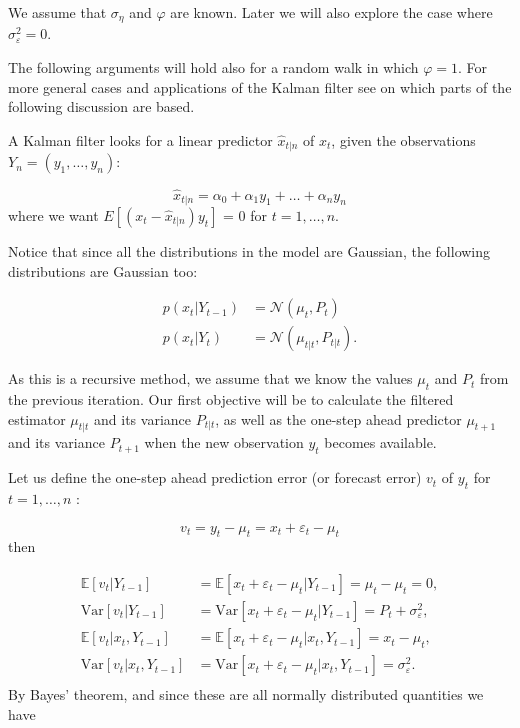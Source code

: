 \documentclass[11pt,a4paper]{article}
\newcommand{\E}{\mathbb{E}}
\newcommand{\var}{\mathrm{Var}}
\begin{document}
We assume that $\sigma_\eta$ and $\varphi$ are known. {\color{blue} Later we will also explore the case where $\sigma^2_\varepsilon=0$}.

The following arguments will hold also for a random walk in which $\varphi = 1$. For more general cases and applications of the Kalman filter see \cite{Durbin} on which parts of the following discussion are based.

A Kalman filter looks for a linear predictor $\hat{x}_{t|n}$ of $x_t$, given the observations $Y_n = (y_1, \dots, y_n)$:

\[
    \hat{x}_{t|n} = \alpha_0 + \alpha_1 y_1 + \dots +\alpha_n y_n
\]
where we want $E[(x_t - \hat{x}_{t|n})y_t]$ = 0 for $t = 1, \dots, n$. 

Notice that since all the distributions in the model are Gaussian, the following distributions are Gaussian too:

\begin{align*}
    p(x_t| Y_{t-1}) &= \mathcal{N} (\mu_t, P_t)\\
    p(x_t| Y_t) &= \mathcal{N} (\mu_{t|t}, P_{t|t}).
\end{align*}

As this is a recursive method, we assume that we know the values $\mu_t$ and $P_t$ from the previous iteration. Our first objective will be to calculate the filtered estimator $\mu_{t|t}$ and its variance $P_{t|t}$, as well as the one-step ahead predictor $\mu_{t+1}$ and its variance $P_{t+1}$ when the new observation $y_t$ becomes available.

Let us define the one-step ahead prediction error (or forecast error) $v_t$ of $y_t$ for $t = 1, \dots, n$ :

\[
    v_t = y_t - \mu_t = x_t + \varepsilon_t - \mu_t
\]
then

\begin{align*}
    \E[v_t|Y_{t-1}] &= \E[x_t + \varepsilon_t - \mu_t | Y_{t-1}] = \mu_t - \mu_t = 0,\\
    \var[v_t|Y_{t-1}] &= \var[x_t + \varepsilon_t - \mu_t | Y_{t-1}] = P_t + \sigma^2_\varepsilon,\\
    \E[v_t|x_t, Y_{t-1}] &= \E[x_t + \varepsilon_t - \mu_t |x_t, Y_{t-1}] = x_t - \mu_t,\\
    \var[v_t|x_t, Y_{t-1}] &= \var[x_t + \varepsilon_t - \mu_t |x_t, Y_{t-1}] = \sigma^2_\varepsilon.\\
\end{align*}
By Bayes' theorem, and since these are all normally distributed quantities we have
\end{document}

